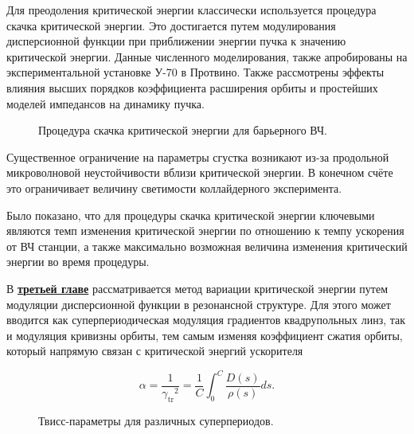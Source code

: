 \par Для преодоления критической энергии классически используется процедура скачка критической энергии. Это достигается путем модулирования дисперсионной функции при приближении энергии пучка к значению критической энергии. Данные численного моделирования, также апробированы на экспериментальной установке У-70 в Протвино. Также рассмотрены эффекты влияния высших порядков коэффициента расширения орбиты и простейших моделей импедансов на динамику пучка.

\begin{figure}[h]
    \caption{Процедура скачка критической энергии для барьерного ВЧ.}\label{fig:latex}
\end{figure}

\par Существенное ограничение на параметры сгустка возникают из-за продольной микроволновой неустойчивости вблизи критической энергии. В конечном счёте это ограничивает величину светимости коллайдерного эксперимента.

\par Было показано, что для процедуры скачка критической энергии ключевыми являются темп изменения критической энергии по отношению к темпу ускорения от ВЧ станции, а также максимально возможная величина изменения критический энергии во время процедуры.

В \underline{\textbf{третьей главе}} рассматривается метод вариации критической энергии путем модуляции дисперсионной функции в резонансной структуре. Для этого может вводится как суперпериодическая модуляция градиентов квадрупольных линз, так и модуляция кривизны орбиты, тем самым изменяя коэффициент сжатия орбиты, который напрямую связан с критической энергий ускорителя

\[
\alpha=\frac{1}{{\gamma_{\text{tr}}}^2}=\frac{1}{C}\int_{0}^{C}\frac{D\left(s\right)}{\rho\left(s\right)}ds.
\label{eq:alpha}
\]

\begin{figure}[ht]
    \caption{Твисс-параметры для различных суперпериодов.}\label{fig:latex}
\end{figure}

